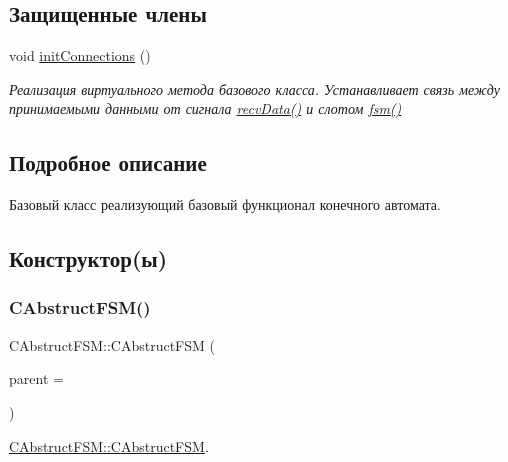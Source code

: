 \subsection*{Защищенные члены}
\begin{DoxyCompactItemize}
\item 
\hypertarget{class_c_abstruct_f_s_m_a9d6f4659a08f3028f8c047243f8dcfc3}{}\label{class_c_abstruct_f_s_m_a9d6f4659a08f3028f8c047243f8dcfc3} 
void \hyperlink{class_c_abstruct_f_s_m_a9d6f4659a08f3028f8c047243f8dcfc3}{init\+Connections} ()
\begin{DoxyCompactList}\small\item\em Реализация виртуального метода базового класса. Устанавливает связь между принимаемыми данными от сигнала \hyperlink{class_c_abstruct_controller_item_a6898e48061cb0cac2065f8193bd386c1}{recv\+Data()} и слотом \hyperlink{class_c_abstruct_f_s_m_ae06497e1f93385cd6c20eaa84fc253c1}{fsm()} \end{DoxyCompactList}\end{DoxyCompactItemize}


\subsection{Подробное описание}
Базовый класс реализующий базовый функционал конечного автомата. 

\subsection{Конструктор(ы)}
\hypertarget{class_c_abstruct_f_s_m_a54037c986f6b437c50d5e8ba42063330}{}\label{class_c_abstruct_f_s_m_a54037c986f6b437c50d5e8ba42063330} 
\subsubsection{\texorpdfstring{C\+Abstruct\+F\+S\+M()}{CAbstructFSM()}}
{\footnotesize\ttfamily C\+Abstruct\+F\+S\+M\+::\+C\+Abstruct\+F\+SM (\begin{DoxyParamCaption}\item[{Q\+Object $\ast$}]{parent = {} }\end{DoxyParamCaption})\hspace{0.3cm}{\ttfamily [explicit]}}



\hyperlink{class_c_abstruct_f_s_m_a54037c986f6b437c50d5e8ba42063330}{C\+Abstruct\+F\+S\+M\+::\+C\+Abstruct\+F\+SM}. 


